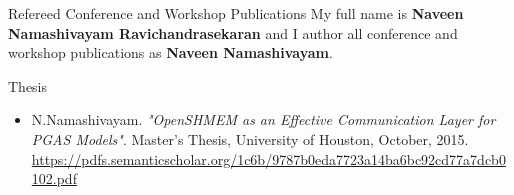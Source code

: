 \documentclass{resume}
\begin{document}

\begin{rSection}{Refereed Conference and Workshop Publications}
My full name is \textbf{Naveen Namashivayam Ravichandrasekaran} and I author all
conference and workshop publications as \textbf{Naveen Namashivayam}.

\end{rSection}

\begin{rSection}{Thesis}
\begin{itemize}
\item N.Namashivayam.
      \textit{"OpenSHMEM as an Effective Communication Layer for PGAS Models"}.
      Master's Thesis, University of Houston, October, 2015.\\
      \url{https://pdfs.semanticscholar.org/1c6b/9787b0eda7723a14ba6bc92cd77a7dcb0102.pdf}
\end{itemize}
\end{rSection}
\end{document}
